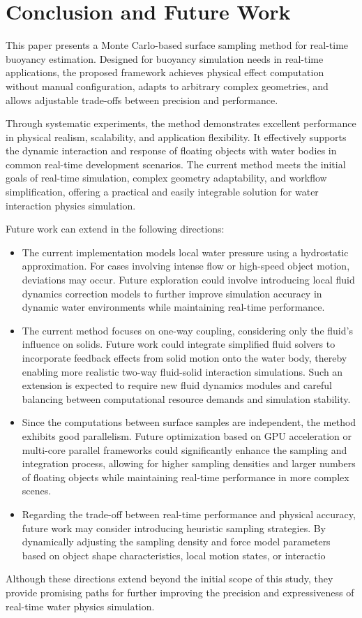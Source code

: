 \section{Conclusion and Future Work}

This paper presents a Monte Carlo-based surface sampling method for real-time buoyancy estimation. Designed for buoyancy simulation needs in real-time applications, the proposed framework achieves physical effect computation without manual configuration, adapts to arbitrary complex geometries, and allows adjustable trade-offs between precision and performance.

Through systematic experiments, the method demonstrates excellent performance in physical realism, scalability, and application flexibility. It effectively supports the dynamic interaction and response of floating objects with water bodies in common real-time development scenarios. The current method meets the initial goals of real-time simulation, complex geometry adaptability, and workflow simplification, offering a practical and easily integrable solution for water interaction physics simulation.

Future work can extend in the following directions:

\begin{itemize}
	\item The current implementation models local water pressure using a hydrostatic approximation. For cases involving intense flow or high-speed object motion, deviations may occur. Future exploration could involve introducing local fluid dynamics correction models to further improve simulation accuracy in dynamic water environments while maintaining real-time performance.

	\item The current method focuses on one-way coupling, considering only the fluid’s influence on solids. Future work could integrate simplified fluid solvers to incorporate feedback effects from solid motion onto the water body, thereby enabling more realistic two-way fluid-solid interaction simulations. Such an extension is expected to require new fluid dynamics modules and careful balancing between computational resource demands and simulation stability.

	\item Since the computations between surface samples are independent, the method exhibits good parallelism. Future optimization based on GPU acceleration or multi-core parallel frameworks could significantly enhance the sampling and integration process, allowing for higher sampling densities and larger numbers of floating objects while maintaining real-time performance in more complex scenes.

	\item Regarding the trade-off between real-time performance and physical accuracy, future work may consider introducing heuristic sampling strategies. By dynamically adjusting the sampling density and force model parameters based on object shape characteristics, local motion states, or interactio
\end{itemize}

Although these directions extend beyond the initial scope of this study, they provide promising paths for further improving the precision and expressiveness of real-time water physics simulation.
